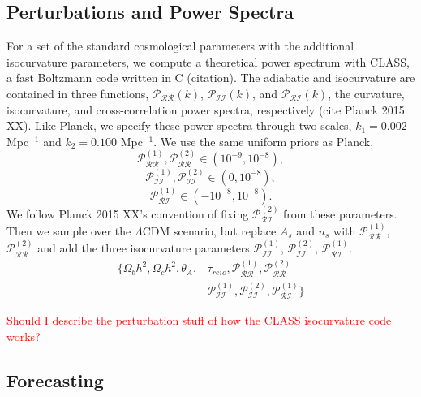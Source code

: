 \documentclass[11pt,a4paper]{emulateapj}
\newcommand\myworries[1]{\textcolor{red}{#1}}
\begin{document}
\subsection{Perturbations and Power Spectra}
For a set of the standard cosmological parameters with the additional isocurvature parameters, we compute a theoretical power spectrum with CLASS, a fast Boltzmann code written in C (citation). The adiabatic and isocurvature are contained in three functions, $\mathcal{P}_{\mathcal{RR}}(k)$, $\mathcal{P}_{\mathcal{II}}(k)$, and $\mathcal{P}_{\mathcal{RI}}(k)$, the curvature, isocurvature, and cross-correlation power spectra, respectively (cite Planck 2015 XX). Like Planck, we specify these power spectra through two scales, $k_1 = 0.002$ Mpc$^{-1}$ and $k_2 = 0.100$ Mpc$^{-1}$. We use the same uniform priors as Planck,
\begin{equation}
    \mathcal{P}_{\mathcal{RR}}^{(1)}, \mathcal{P}_{\mathcal{RR}}^{(2)} \in (10^{-9}, 10^{-8}),
\end{equation}
\begin{equation}
    \mathcal{P}_{\mathcal{II}}^{(1)}, \mathcal{P}_{\mathcal{II}}^{(2)} \in (0, 10^{-8}),
\end{equation}
\begin{equation}
    \mathcal{P}_{\mathcal{RI}}^{(1)} \in (-10^{-8}, 10^{-8}).
\end{equation}
We follow Planck 2015 XX's convention of fixing $\mathcal{P}_{\mathcal{RI}}^{(2)}$ from these parameters. Then we sample over the $\Lambda$CDM scenario, but replace $A_s$ and $n_s$ with $\mathcal{P}_{\mathcal{RR}}^{(1)}$,  $\mathcal{P}_{\mathcal{RR}}^{(2)}$ and add the three isocurvature parameters $\mathcal{P}_{\mathcal{II}}^{(1)}$, $\mathcal{P}_{\mathcal{II}}^{(2)}$, $\mathcal{P}_{\mathcal{RI}}^{(1)}$.
\begin{align}
\{ \Omega_b h^2, \Omega_c h^2, \theta_A, &\tau_{reio}, \mathcal{P}_{\mathcal{RR}}^{(1)}, \mathcal{P}_{\mathcal{RR}}^{(2)} \\
& \mathcal{P}_{\mathcal{II}}^{(1)}, \mathcal{P}_{\mathcal{II}}^{(2)}, \mathcal{P}_{\mathcal{RI}}^{(1)}    \}
\end{align}

\myworries{Should I describe the perturbation stuff of how the CLASS isocurvature code works?}



\subsection{Forecasting}
\end{document}
